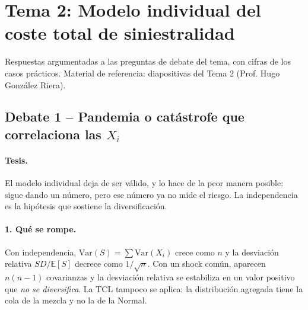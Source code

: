 \documentclass[a4paper,12pt]{article}
\newcommand{\E}{\mathbb{E}}
\newcommand{\Var}{\mathrm{Var}}
\begin{document}
\restoregeometry
\newpage
{}
\setcounter{page}{1}

\section{Tema 2: Modelo individual del coste total de siniestralidad}
\label{sec:tema2debate}
\noindent
Respuestas argumentadas a las preguntas de debate del tema, con cifras de los casos prácticos. Material de referencia: diapositivas del Tema 2 (Prof. Hugo González Riera).

\subsection{Debate 1 -- Pandemia o cat\'astrofe que correlaciona las $X_i$}

\paragraph{Tesis.} El modelo individual deja de ser v\'alido, y lo hace de la peor manera posible: sigue dando un n\'umero, pero ese n\'umero ya no mide el riesgo. La independencia es la hip\'otesis que sostiene la diversificaci\'on.

\paragraph{1. Qu\'e se rompe.} Con independencia, $\Var(S)=\sum\Var(X_i)$ crece como $n$ y la desviaci\'on relativa $SD/\E[S]$ decrece como $1/\sqrt n$. Con un shock com\'un, aparecen $n(n-1)$ covarianzas y la desviaci\'on relativa se estabiliza en un valor positivo que \emph{no se diversifica}. La TCL tampoco se aplica: la distribuci\'on agregada tiene la cola de la mezcla y no la de la Normal.
\end{document}

